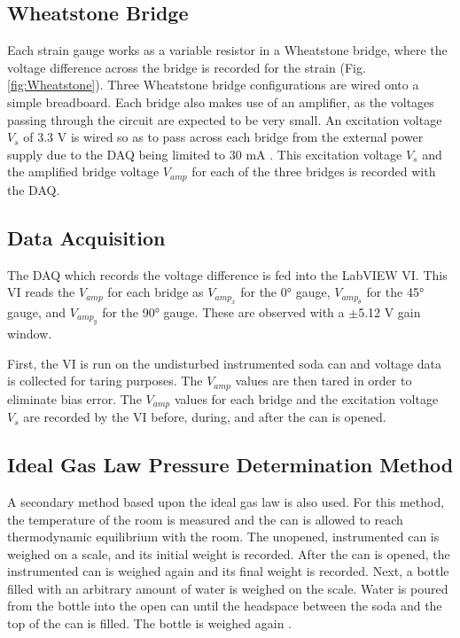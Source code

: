 \documentclass[10pt,journal,letterpaper]{IEEEtran}
\begin{document}
\subsection{Wheatstone Bridge}

Each strain gauge works as a variable resistor in a Wheatstone bridge, where the voltage difference across the bridge is recorded for the strain (Fig. \ref{fig:Wheatstone}).
Three Wheatstone bridge configurations are wired onto a simple breadboard.
Each bridge also makes use of an amplifier, as the voltages passing through the circuit are expected to be very small.
An excitation voltage $V_s$ of 3.3 V is wired so as to pass across each bridge from the external power supply due to the DAQ being limited to 30 mA \cite{b10}.
This excitation voltage $V_s$ and the amplified bridge voltage $V_{amp}$ for each of the three bridges is recorded with the DAQ.

\subsection{Data Acquisition}

The DAQ which records the voltage difference is fed into the LabVIEW VI.
This VI reads the $V_{amp}$ for each bridge as $V_{amp_x}$ for the \ang{0} gauge, $V_{amp_\theta}$  for the \ang{45} gauge, and $V_{amp_y}$ for the \ang{90} gauge.
These are observed with a $\pm$5.12 V gain window.

First, the VI is run on the undisturbed instrumented soda can and voltage data is collected for taring purposes.
The $V_{amp}$ values are then tared in order to eliminate bias error.
The $V_{amp}$ values for each bridge and the excitation voltage $V_s$ are recorded by the VI before, during, and after the can is opened. 

\subsection{Ideal Gas Law Pressure Determination Method}

A secondary method based upon the ideal gas law is also used.
For this method, the temperature of the room is measured and the can is allowed to reach thermodynamic equilibrium with the room.
The unopened, instrumented can is weighed on a scale, and its initial weight is recorded.
After the can is opened, the instrumented can is weighed again and its final weight is recorded.
Next, a bottle filled with an arbitrary amount of water is weighed on the scale.
Water is poured from the bottle into the open can until the headspace between the soda and the top of the can is filled.
The bottle is weighed again \cite{b9}.
\end{document}
